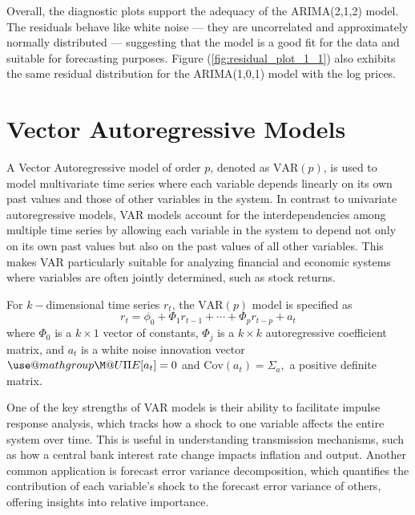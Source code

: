 \documentclass[12pt]{article}
\makeatletter
\def\amsbb{\use@mathgroup \M@U \symAMSb}
\makeatother
\begin{document}
Overall, the diagnostic plots support the adequacy of the ARIMA(2,1,2) model. The residuals behave like white noise — they are uncorrelated and approximately normally distributed — suggesting that the model is a good fit for the data and suitable for forecasting purposes. Figure (\ref{fig:residual_plot_1_1}) also exhibits the same residual distribution for the ARIMA(1,0,1) model with the log prices.

\section*{Vector Autoregressive Models}

A Vector Autoregressive model of order $p$, denoted as $\text{VAR}(p)$, is used to model multivariate time series where each variable depends linearly on its own past values and those of other variables in the system. In contrast to univariate autoregressive models, VAR models account for the interdependencies among multiple time series by allowing each variable in the system to depend not only on its own past values but also on the past values of all other variables. This makes VAR particularly suitable for analyzing financial and economic systems where variables are often jointly determined, such as stock returns.

For $k-$dimensional time series $r_t$, the $\text{VAR}(p)$ model is specified as 
\begin{equation}
	r_t=\phi_0+\Phi_1 r_{t-1}+\cdots+\Phi_pr_{t-p}+a_t
\end{equation}
where $\Phi_0$ is a $k\times 1$ vector of constants, $\Phi_j$ is a $k\times k$ autoregressive coefficient matrix, and $a_t$ is a white noise innovation vector $\amsbb{E}[a_t]=0$ and $\text{Cov}(a_t)=\Sigma_a,$ a positive definite matrix.

One of the key strengths of VAR models is their ability to facilitate impulse response analysis, which tracks how a shock to one variable affects the entire system over time. This is useful in understanding transmission mechanisms, such as how a central bank interest rate change impacts inflation and output. Another common application is forecast error variance decomposition, which quantifies the contribution of each variable’s shock to the forecast error variance of others, offering insights into relative importance.
\end{document}
